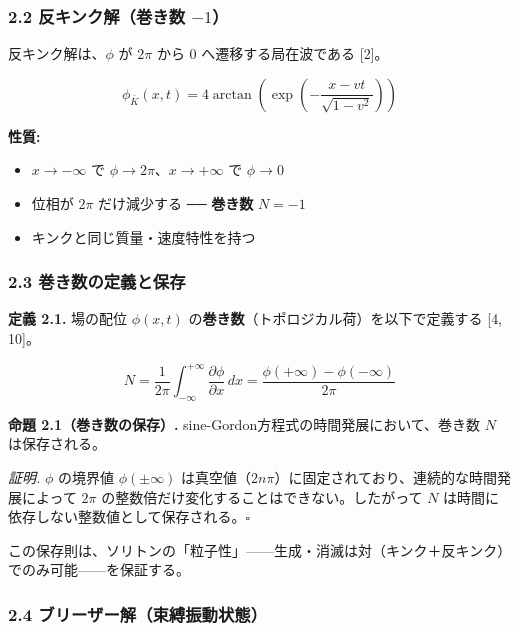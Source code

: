 \documentclass[a4paper,11pt]{ltjsarticle}
\providecommand{\tightlist}{\setlength{\itemsep}{0pt}\setlength{\parskip}{0pt}}
\begin{document}
\subsubsection{\texorpdfstring{2.2 反キンク解（巻き数
\(-1\)）}{2.2 反キンク解（巻き数 -1）}}\label{ux53cdux30adux30f3ux30afux89e3ux5dfbux304dux6570--1}

反キンク解は、\(\phi\) が \(2\pi\) から \(0\) へ遷移する局在波である
{[}2{]}。

\[\phi_{\bar{K}}(x, t) = 4\arctan\left(\exp\left(-\frac{x - vt}{\sqrt{1 - v^2}}\right)\right)\]

\textbf{性質:}

\begin{itemize}
\tightlist
\item
  \(x \to -\infty\) で \(\phi \to 2\pi\)、\(x \to +\infty\) で
  \(\phi \to 0\)
\item
  位相が \(2\pi\) だけ減少する ── \textbf{巻き数} \(N = -1\)
\item
  キンクと同じ質量・速度特性を持つ
\end{itemize}

\subsubsection{2.3
巻き数の定義と保存}\label{ux5dfbux304dux6570ux306eux5b9aux7fa9ux3068ux4fddux5b58}

\textbf{定義 2.1.} 場の配位 \(\phi(x, t)\)
の\textbf{巻き数}（トポロジカル荷）を以下で定義する {[}4, 10{]}。

\[N = \frac{1}{2\pi}\int_{-\infty}^{+\infty} \frac{\partial \phi}{\partial x}\,dx = \frac{\phi(+\infty) - \phi(-\infty)}{2\pi}\]

\textbf{命題 2.1（巻き数の保存）.}
sine-Gordon方程式の時間発展において、巻き数 \(N\) は保存される。

\emph{証明.} \(\phi\) の境界値 \(\phi(\pm\infty)\)
は真空値（\(2n\pi\)）に固定されており、連続的な時間発展によって \(2\pi\)
の整数倍だけ変化することはできない。したがって \(N\)
は時間に依存しない整数値として保存される。\(\square\)

この保存則は、ソリトンの「粒子性」------生成・消滅は対（キンク＋反キンク）でのみ可能------を保証する。

\subsubsection{2.4
ブリーザー解（束縛振動状態）}\label{ux30d6ux30eaux30fcux30b6ux30fcux89e3ux675fux7e1bux632fux52d5ux72b6ux614b}
\end{document}
